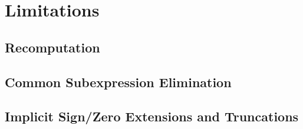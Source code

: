 %

\chapter{Limitations}

\section{Recomputation}
\section{Common Subexpression Elimination}
\section{Implicit Sign/Zero Extensions and Truncations}
